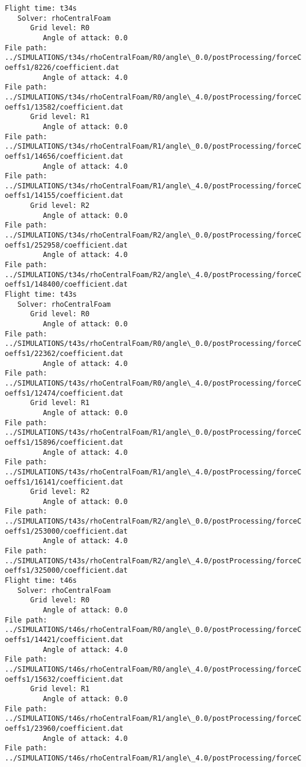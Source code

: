 \documentclass[11pt]{article}
\begin{document}
    \begin{Verbatim}[commandchars=\\\{\}]
Flight time: t34s
   Solver: rhoCentralFoam
      Grid level: R0
         Angle of attack: 0.0
File path: ../SIMULATIONS/t34s/rhoCentralFoam/R0/angle\_0.0/postProcessing/forceC
oeffs1/8226/coefficient.dat
         Angle of attack: 4.0
File path: ../SIMULATIONS/t34s/rhoCentralFoam/R0/angle\_4.0/postProcessing/forceC
oeffs1/13582/coefficient.dat
      Grid level: R1
         Angle of attack: 0.0
File path: ../SIMULATIONS/t34s/rhoCentralFoam/R1/angle\_0.0/postProcessing/forceC
oeffs1/14656/coefficient.dat
         Angle of attack: 4.0
File path: ../SIMULATIONS/t34s/rhoCentralFoam/R1/angle\_4.0/postProcessing/forceC
oeffs1/14155/coefficient.dat
      Grid level: R2
         Angle of attack: 0.0
File path: ../SIMULATIONS/t34s/rhoCentralFoam/R2/angle\_0.0/postProcessing/forceC
oeffs1/252958/coefficient.dat
         Angle of attack: 4.0
File path: ../SIMULATIONS/t34s/rhoCentralFoam/R2/angle\_4.0/postProcessing/forceC
oeffs1/148400/coefficient.dat
Flight time: t43s
   Solver: rhoCentralFoam
      Grid level: R0
         Angle of attack: 0.0
File path: ../SIMULATIONS/t43s/rhoCentralFoam/R0/angle\_0.0/postProcessing/forceC
oeffs1/22362/coefficient.dat
         Angle of attack: 4.0
File path: ../SIMULATIONS/t43s/rhoCentralFoam/R0/angle\_4.0/postProcessing/forceC
oeffs1/12474/coefficient.dat
      Grid level: R1
         Angle of attack: 0.0
File path: ../SIMULATIONS/t43s/rhoCentralFoam/R1/angle\_0.0/postProcessing/forceC
oeffs1/15896/coefficient.dat
         Angle of attack: 4.0
File path: ../SIMULATIONS/t43s/rhoCentralFoam/R1/angle\_4.0/postProcessing/forceC
oeffs1/16141/coefficient.dat
      Grid level: R2
         Angle of attack: 0.0
File path: ../SIMULATIONS/t43s/rhoCentralFoam/R2/angle\_0.0/postProcessing/forceC
oeffs1/253000/coefficient.dat
         Angle of attack: 4.0
File path: ../SIMULATIONS/t43s/rhoCentralFoam/R2/angle\_4.0/postProcessing/forceC
oeffs1/325000/coefficient.dat
Flight time: t46s
   Solver: rhoCentralFoam
      Grid level: R0
         Angle of attack: 0.0
File path: ../SIMULATIONS/t46s/rhoCentralFoam/R0/angle\_0.0/postProcessing/forceC
oeffs1/14421/coefficient.dat
         Angle of attack: 4.0
File path: ../SIMULATIONS/t46s/rhoCentralFoam/R0/angle\_4.0/postProcessing/forceC
oeffs1/15632/coefficient.dat
      Grid level: R1
         Angle of attack: 0.0
File path: ../SIMULATIONS/t46s/rhoCentralFoam/R1/angle\_0.0/postProcessing/forceC
oeffs1/23960/coefficient.dat
         Angle of attack: 4.0
File path: ../SIMULATIONS/t46s/rhoCentralFoam/R1/angle\_4.0/postProcessing/forceC

\end{Verbatim}
\end{document}
